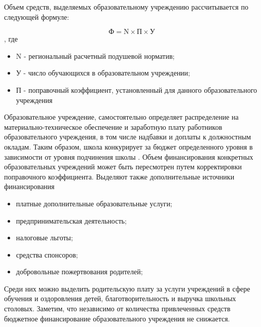                  
Объем средств, выделяемых образовательному учреждению рассчитывается по следующей формуле:

$$
    \text{Ф}= \text{N} \times \text{П} \times \text{У}
$$    
, где
\begin{itemize}
    \item  N - региональный расчетный подушевой норматив;
    \item У - число обучающихся в образовательном учреждении;
    \item П - поправочный коэффициент, установленный для данного образовательного учреждения
\end{itemize}
            
Образовательное учреждение, самостоятельно определяет распределение на материально-техническое обеспечение и заработную плату работников образовательного учреждения, в том числе надбавки и доплаты к должностным окладам.
Таким образом, школа конкурирует за бюджет определенного уровня в зависимости от уровня подчинения школы .
Объем финансирования конкретных образовательных учреждений может быть пересмотрен путем корректировки поправочного коэффициента.
Выделяют также дополнительные источники финансирования
\begin{itemize}
    \item платные дополнительные образовательные услуги;
    \item предпринимательская деятельность; 
    \item налоговые льготы;
    \item средства спонсоров;
    \item добровольные пожертвования родителей;
\end{itemize}
 
Среди них можно выделить родительскую плату за услуги учреждений в сфере обучения и оздоровления детей, благотворительность и выручка школьных столовых.
Заметим, что независимо от количества привлеченных средств бюджетное финансирование образовательного учреждения не снижается.
